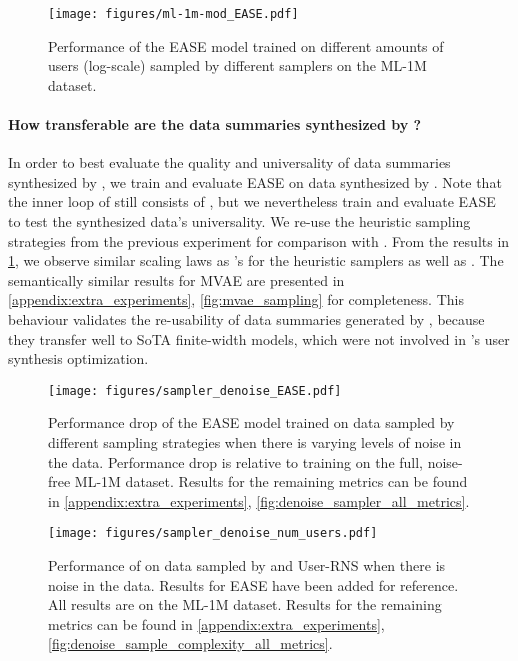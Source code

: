 \documentclass{article}
\begin{document}
\begin{figure}[t!] 
    \texttt{[image: figures/ml-1m-mod\_EASE.pdf]}
    \caption{Performance of the EASE model trained on different amounts of users (log-scale) sampled by different samplers on the ML-1M dataset.}
    \label{fig:ease_sampling}
\end{figure}

\paragraph{How transferable are the data summaries synthesized by \sampler?} In order to best evaluate the quality and universality of data summaries synthesized by \sampler, we train and evaluate EASE \cite{ease} 
on data synthesized by \sampler. Note that the inner loop of \sampler still consists of \model, but we nevertheless train and evaluate EASE to test the synthesized data’s universality. 
We re-use the heuristic sampling strategies from the previous experiment for comparison with \sampler. From the results in \cref{fig:ease_sampling}, we observe similar scaling laws as \model's for the heuristic samplers as well as \sampler. 
The semantically similar results for MVAE \cite{mvae} are presented in \cref{appendix:extra_experiments}, \cref{fig:mvae_sampling} for completeness. This behaviour validates the re-usability of data summaries generated by \sampler, because they transfer well to SoTA finite-width models, which were not involved in \sampler's user synthesis optimization.

\begin{figure}[t!] 
    \texttt{[image: figures/sampler\_denoise\_EASE.pdf]}
    \caption{Performance drop of the EASE model trained on data sampled by different sampling strategies when there is varying levels of noise in the data. Performance drop is relative to training on the full, noise-free ML-1M dataset. Results for the remaining metrics can be found in \cref{appendix:extra_experiments}, \cref{fig:denoise_sampler_all_metrics}.}
    \label{fig:denoise_sampler}
\end{figure}

\begin{figure}[t!] 
    \texttt{[image: figures/sampler\_denoise\_num\_users.pdf]}
    \caption{Performance of \model on data sampled by \sampler and User-RNS when there is noise in the data. Results for EASE have been added for reference. All results are on the ML-1M dataset. Results for the remaining metrics can be found in \cref{appendix:extra_experiments}, \cref{fig:denoise_sample_complexity_all_metrics}.}
    \label{fig:denoise_sample_complexity}
\end{figure}
\end{document}
